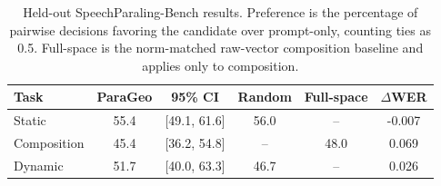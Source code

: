 \begin{table}[t]
\centering
\caption{Held-out SpeechParaling-Bench results. Preference is the percentage of pairwise decisions favoring the candidate over prompt-only, counting ties as 0.5. Full-space is the norm-matched raw-vector composition baseline and applies only to composition.}
\label{tab:main}
\begin{tabular}{lccccc}
\hline
Task & ParaGeo & 95\% CI & Random & Full-space & $\Delta$WER \\
\hline
Static & 55.4 & [49.1, 61.6] & 56.0 & -- & -0.007 \\
Composition & 45.4 & [36.2, 54.8] & -- & 48.0 & 0.069 \\
Dynamic & 51.7 & [40.0, 63.3] & 46.7 & -- & 0.026 \\
\hline
\end{tabular}
\end{table}
